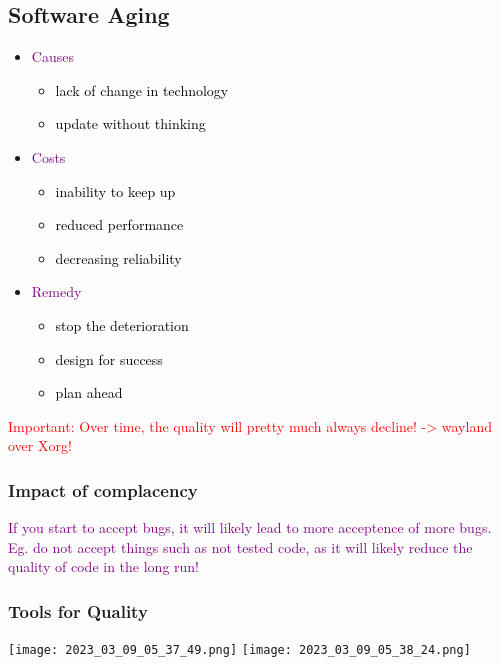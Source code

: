 \documentclass[main.tex,fontsize=8pt,paper=a4,paper=portrait,DIV=calc,]{scrartcl}
\begin{document}
\subsection{Software Aging}
\begin{itemize}
\item \textcolor{purple}{Causes}\newline
  \begin{itemize}
  \item \textcolor{black}{lack of change in technology}
  \item \textcolor{black}{update without thinking}
  \end{itemize} 
\item \textcolor{purple}{Costs}\newline
  \begin{itemize}
  \item \textcolor{black}{inability to keep up}
  \item \textcolor{black}{reduced performance}
  \item \textcolor{black}{decreasing reliability}
  \end{itemize} 
\item \textcolor{purple}{Remedy}\newline
  \begin{itemize}
  \item \textcolor{black}{stop the deterioration}
  \item \textcolor{black}{design for success}
  \item \textcolor{black}{plan ahead}
  \end{itemize} 
\end{itemize} 
\textcolor{red}{Important: Over time, the quality will pretty much always decline! -> wayland over Xorg!}

\subsubsection{Impact of complacency}
\textcolor{purple}{If you start to accept bugs, it will likely lead to more acceptence of more bugs. \newline
Eg. do not accept things such as not tested code, as it will likely reduce the quality of code in the long run!}

\subsubsection{Tools for Quality}
\texttt{[image: 2023\_03\_09\_05\_37\_49.png]}
\texttt{[image: 2023\_03\_09\_05\_38\_24.png]}
\end{document}
